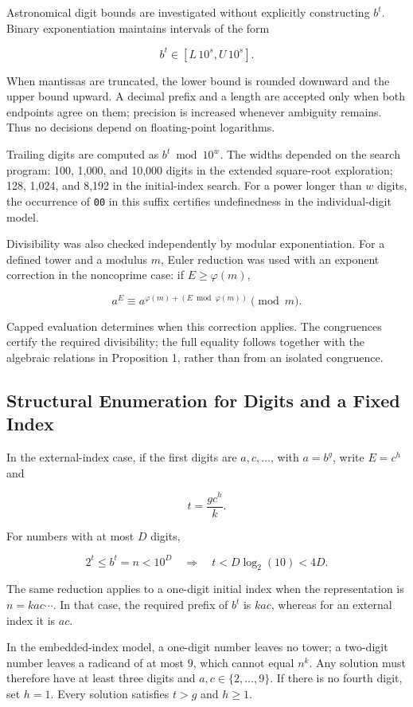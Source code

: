 \documentclass[11pt,a4paper]{article}
\begin{document}
Astronomical digit bounds are investigated without explicitly constructing $b^t$. Binary exponentiation maintains intervals of the form

\[
b^t\in[L\,10^s,U\,10^s].
\]

When mantissas are truncated, the lower bound is rounded downward and the upper bound upward. A decimal prefix and a length are accepted only when both endpoints agree on them; precision is increased whenever ambiguity remains. Thus no decisions depend on floating-point logarithms.

Trailing digits are computed as $b^t\bmod10^w$. The widths depended on the search program: 100, 1,000, and 10,000 digits in the extended square-root exploration; 128, 1,024, and 8,192 in the initial-index search. For a power longer than $w$ digits, the occurrence of \texttt{00} in this suffix certifies undefinedness in the individual-digit model.

Divisibility was also checked independently by modular exponentiation. For a defined tower and a modulus $m$, Euler reduction was used with an exponent correction in the noncoprime case: if $E\geq\varphi(m)$,

\[
a^E\equiv a^{\varphi(m)+(E\bmod\varphi(m))}\pmod m.
\]

Capped evaluation determines when this correction applies. The congruences certify the required divisibility; the full equality follows together with the algebraic relations in Proposition 1, rather than from an isolated congruence.

\subsection{Structural Enumeration for Digits and a Fixed Index}

In the external-index case, if the first digits are $a,c,\ldots$, with $a=b^g$, write $E=c^h$ and

\[
t=\frac{g c^h}{k}.
\]

For numbers with at most $D$ digits,

\[
2^t\leq b^t=n<10^D
\quad\Longrightarrow\quad
t<D\log_2(10)<4D.
\]

The same reduction applies to a one-digit initial index when the representation is $n=kac\cdots$. In that case, the required prefix of $b^t$ is $kac$, whereas for an external index it is $ac$.

In the embedded-index model, a one-digit number leaves no tower; a two-digit number leaves a radicand of at most $9$, which cannot equal $n^k$. Any solution must therefore have at least three digits and $a,c\in\{2,\ldots,9\}$. If there is no fourth digit, set $h=1$. Every solution satisfies $t>g$ and $h\geq1$.
\end{document}
